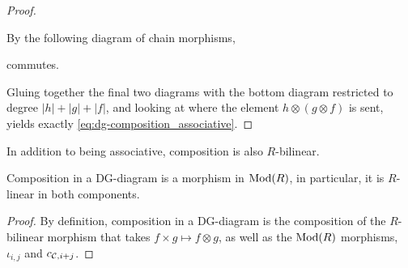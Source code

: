 \begin{proof}
\begin{center}
    \end{center}

    By \cite[Definition 6.2.1]{Borceux_1994} the following diagram of chain morphisms,
    \begin{center}
    \end{center}
    commutes.

    Gluing together the final two diagrams with the bottom diagram restricted to degree \( |h| + |g| + |f| \), and looking at where the element \( h \otimes (g \otimes f) \) is sent, yields exactly \eqref{eq:dg-composition_associative}.
\end{proof}

In addition to being associative, composition is also \( R \)-bilinear.

\begin{lemma}
    Composition in a DG-diagram is a morphism in \( \operatorname{Mod}(R) \), in particular, it is \( R \)-linear in both components.
\end{lemma}
\begin{proof}
    By definition, composition in a DG-diagram is the composition of the \( R \)-bilinear morphism that takes \( f \times g \mapsto f \otimes g \), as well as the \( \operatorname{Mod}(R) \) morphisms, \( \iota_{i, j} \) and \( c_{{\mathcal{C}}, i + j} \).
\end{proof}

